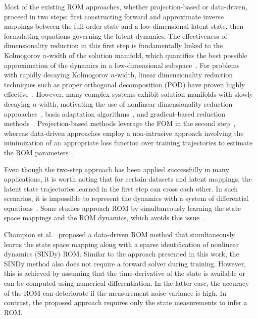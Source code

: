 \documentclass{article}
\begin{document}
	Most of the existing ROM approaches, whether projection-based or data-driven, proceed in two steps: first constructing forward and approximate inverse mappings between the full-order state and a low-dimensional latent state, then formulating equations governing the latent dynamics.
	The effectiveness of dimensionality reduction in this first step is fundamentally linked to the Kolmogorov $n$-width of the solution manifold, which quantifies the best possible approximation of the dynamics in a low-dimensional subspace~\cite{Peherstorfer2022}. For problems with rapidly  decaying Kolmogorov $n$-width, linear dimensionality reduction techniques such as proper orthogonal decomposition (POD) have proven highly effective~\cite{Audouze2009, Audouze2013, Benner2022,Peherstorfer_2016_Operator_Inference,McQuarrie2023,Wan_2018_ROM}. However, many complex systems exhibit solution manifolds with slowly decaying $n$-width, motivating the use of nonlinear dimensionality reduction approaches~\cite{Xing2015, Xing2016,XuDuraisamy2020, LeeCarlberg2020, Kim_2022_PINN_ROM,Maulik2021, Barnett2022, Romor2023}, basis adaptation algorithms~\cite{Huang_2023_ROM_Chaotic_Problems}, and gradient-based reduction methods~\cite{Baptista_2022_Gradient_Reduction}. 
	Projection-based methods leverage the FOM in the second step~\cite{Benner2015,Benner2022,LeeCarlberg2020,Kim_2022_PINN_ROM}, whereas data-driven approaches employ a non-intrusive approach involving the minimization of an appropriate loss function over training trajectories to estimate the ROM parameters~\cite{Audouze2013, Xing2016, Peherstorfer_2016_Operator_Inference, McQuarrie2023,Fries_2022_LaSDI,DuanHesthaven2024}.
	
	Even though the two-step approach has been applied successfully in many applications, it is worth noting that for certain datasets and latent mappings, the latent state trajectories learned in the first step can cross each other. In such scenarios, it is impossible to represent the dynamics with a system of differential equations~\cite{Dupont_2019_ANODE}. Some studies approach ROM by simultaneously learning the state space mappings and the ROM dynamics, which avoids this issue~\cite{Lee_2021_Parameterized_Neural_ODE_ROM,Champion_2019_Data_Driven_Coordinates, Aka_2025_Balanced_Neural_ODEs}.
	
	Champion et al.~\cite{Champion_2019_Data_Driven_Coordinates} proposed a data-driven ROM method that simultaneously learns the state space mapping along with a sparse identification of nonlinear dynamics (SINDy) ROM. Similar to the approach presented in this work, the SINDy method also does not require a forward solver during training. However, this is achieved by assuming that the time-derivative of the state is available or can be computed using numerical differentiation. In the latter case, the accuracy of the ROM can deteriorate if the measurement noise variance is high. In contrast, the  proposed approach requires only the state measurements to infer a ROM.
	
\end{document}
